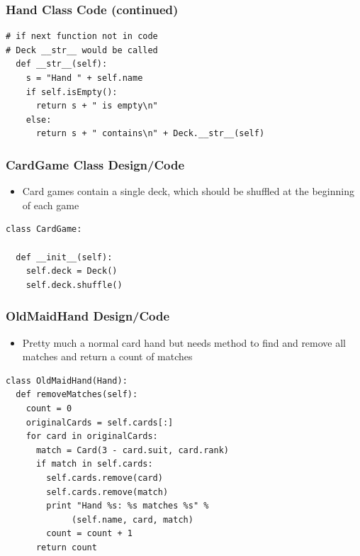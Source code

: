 \documentclass{beamer}
\begin{document}
\begin{frame}[fragile]
\frametitle{Hand Class Code (continued)}
\fontvi
\begin{lstlisting}
# if next function not in code 
# Deck __str__ would be called
  def __str__(self):
    s = "Hand " + self.name
    if self.isEmpty():
      return s + " is empty\n"
    else:
      return s + " contains\n" + Deck.__str__(self)
\end{lstlisting}
\end{frame}

\begin{frame}[fragile]
\frametitle{CardGame Class Design/Code}
\fontvi
\begin{itemize}
\item Card games contain a single deck, which should be shuffled at the beginning of each game
\end{itemize}
\begin{lstlisting}
class CardGame:

  def __init__(self):
    self.deck = Deck()
    self.deck.shuffle()
\end{lstlisting}
\end{frame}

\begin{frame}[fragile]
\frametitle{OldMaidHand Design/Code}
\fontvi
\begin{itemize}
\item Pretty much a normal card hand but needs method to find and remove all matches and return a count of matches
\end{itemize}
\begin{lstlisting}
class OldMaidHand(Hand):
  def removeMatches(self):
    count = 0
    originalCards = self.cards[:]
    for card in originalCards:
      match = Card(3 - card.suit, card.rank)
      if match in self.cards:
        self.cards.remove(card)
        self.cards.remove(match)
        print "Hand %s: %s matches %s" % 
             (self.name, card, match)
        count = count + 1
      return count

\end{lstlisting}
\end{frame}
\end{document}
